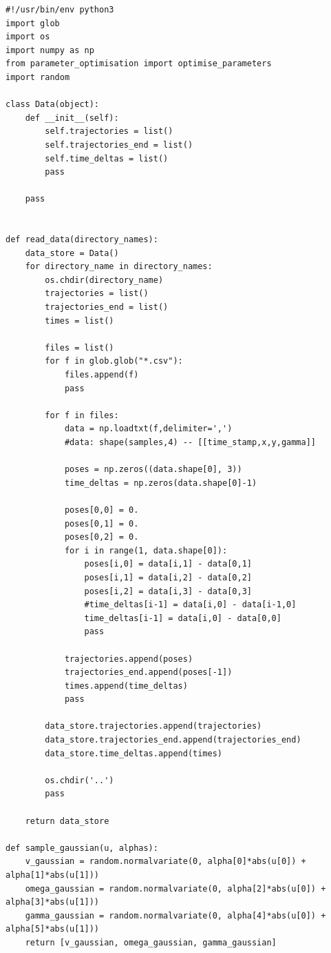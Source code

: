 \documentclass[a4paper, 12pt]{article}
\begin{document}
\begin{lstlisting}
#!/usr/bin/env python3
import glob
import os
import numpy as np
from parameter_optimisation import optimise_parameters
import random

class Data(object):
    def __init__(self):
        self.trajectories = list()
        self.trajectories_end = list()
        self.time_deltas = list()
        pass

    pass


def read_data(directory_names):
    data_store = Data()
    for directory_name in directory_names:
        os.chdir(directory_name)
        trajectories = list()
        trajectories_end = list()
        times = list()

        files = list()
        for f in glob.glob("*.csv"):
            files.append(f)
            pass

        for f in files:
            data = np.loadtxt(f,delimiter=',')
            #data: shape(samples,4) -- [[time_stamp,x,y,gamma]]

            poses = np.zeros((data.shape[0], 3))
            time_deltas = np.zeros(data.shape[0]-1)

            poses[0,0] = 0.
            poses[0,1] = 0.
            poses[0,2] = 0.
            for i in range(1, data.shape[0]):
                poses[i,0] = data[i,1] - data[0,1]
                poses[i,1] = data[i,2] - data[0,2]
                poses[i,2] = data[i,3] - data[0,3]
                #time_deltas[i-1] = data[i,0] - data[i-1,0]
                time_deltas[i-1] = data[i,0] - data[0,0]
                pass

            trajectories.append(poses)
            trajectories_end.append(poses[-1])
            times.append(time_deltas)
            pass

        data_store.trajectories.append(trajectories)
        data_store.trajectories_end.append(trajectories_end)
        data_store.time_deltas.append(times)

        os.chdir('..')
        pass

    return data_store

def sample_gaussian(u, alphas):
    v_gaussian = random.normalvariate(0, alpha[0]*abs(u[0]) + alpha[1]*abs(u[1]))
    omega_gaussian = random.normalvariate(0, alpha[2]*abs(u[0]) + alpha[3]*abs(u[1]))
    gamma_gaussian = random.normalvariate(0, alpha[4]*abs(u[0]) + alpha[5]*abs(u[1]))
    return [v_gaussian, omega_gaussian, gamma_gaussian]


\end{lstlisting}
\end{document}

